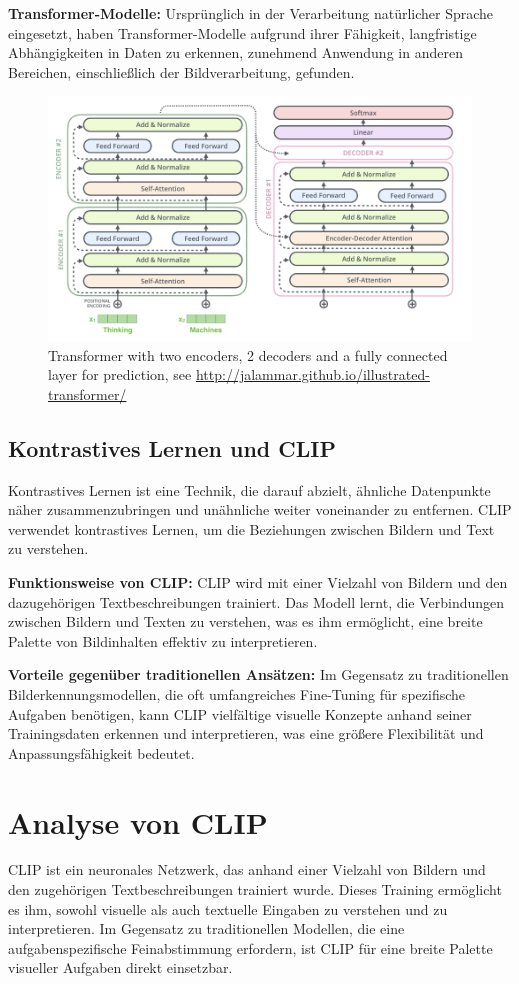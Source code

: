 \documentclass[nolibertine, ngerman, algorithm, nomencl, minted]{ttlab-qualify}
\begin{document}
\textbf{Transformer-Modelle:} Ursprünglich in der Verarbeitung natürlicher Sprache eingesetzt, haben Transformer-Modelle aufgrund ihrer Fähigkeit, langfristige Abhängigkeiten in Daten zu erkennen, zunehmend Anwendung in anderen Bereichen, einschließlich der Bildverarbeitung, gefunden.
\begin{figure}[h]
	\centering
	\includegraphics[scale=0.5]{static/transformer.png}
	\caption{Transformer with two encoders, 2 decoders and a fully connected layer for prediction, see \url{http://jalammar.github.io/illustrated-transformer/}}
	\label{fig:2.3}
\end{figure}

\subsection{Kontrastives Lernen und CLIP}
Kontrastives Lernen ist eine Technik, die darauf abzielt, ähnliche Datenpunkte näher zusammenzubringen und unähnliche weiter voneinander zu entfernen. CLIP verwendet kontrastives Lernen, um die Beziehungen zwischen Bildern und Text zu verstehen.

\textbf{Funktionsweise von CLIP:} CLIP wird mit einer Vielzahl von Bildern und den dazugehörigen Textbeschreibungen trainiert. Das Modell lernt, die Verbindungen zwischen Bildern und Texten zu verstehen, was es ihm ermöglicht, eine breite Palette von Bildinhalten effektiv zu interpretieren.

\textbf{Vorteile gegenüber traditionellen Ansätzen:} Im Gegensatz zu traditionellen Bilderkennungsmodellen, die oft umfangreiches Fine-Tuning für spezifische Aufgaben benötigen, kann CLIP vielfältige visuelle Konzepte anhand seiner Trainingsdaten erkennen und interpretieren, was eine größere Flexibilität und Anpassungsfähigkeit bedeutet.
\section{Analyse von CLIP}
CLIP ist ein neuronales Netzwerk, das anhand einer Vielzahl von Bildern und den zugehörigen Textbeschreibungen trainiert wurde. Dieses Training ermöglicht es ihm, sowohl visuelle als auch textuelle Eingaben zu verstehen und zu interpretieren. Im Gegensatz zu traditionellen Modellen, die eine aufgabenspezifische Feinabstimmung erfordern, ist CLIP für eine breite Palette visueller Aufgaben direkt einsetzbar.
\end{document}
